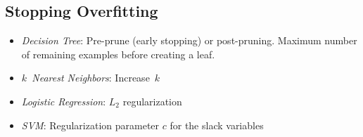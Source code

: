 \documentclass[10pt]{article}
\begin{document}
\begin{multicols}{3}
  \section*{Stopping Overfitting}
  \begin{itemize}
    \item \textit{Decision Tree}: Pre-prune (early stopping) or post-pruning.  Maximum number of remaining examples before creating a leaf.
    \item \textit{$k$~Nearest Neighbors}: Increase~$k$
    \item \textit{Logistic Regression}: $L_2$ regularization
    \item \textit{SVM}: Regularization parameter $c$ for the slack variables
  \end{itemize}
\end{multicols}
\end{document}
